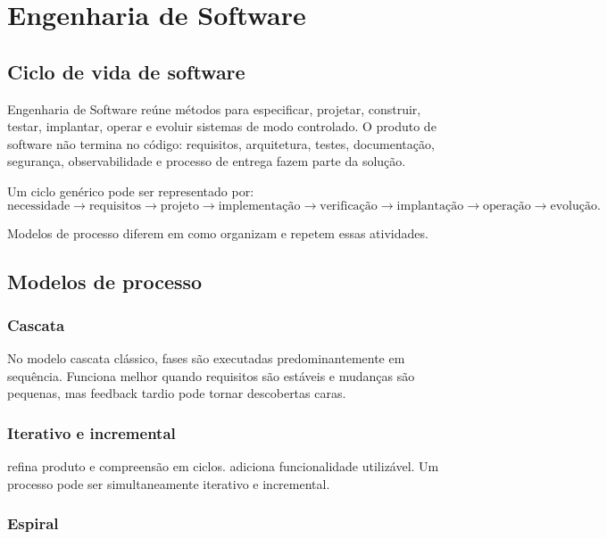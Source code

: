 \chapter{Engenharia de Software}

\section{Ciclo de vida de software}

Engenharia de Software reúne métodos para especificar, projetar, construir, testar, implantar, operar e evoluir sistemas de modo controlado. O produto de software não termina no código: requisitos, arquitetura, testes, documentação, segurança, observabilidade e processo de entrega fazem parte da solução.

Um ciclo genérico pode ser representado por:
\[
\text{necessidade}\rightarrow
\text{requisitos}\rightarrow
\text{projeto}\rightarrow
\text{implementação}\rightarrow
\text{verificação}\rightarrow
\text{implantação}\rightarrow
\text{operação}\rightarrow
\text{evolução}.
\]

Modelos de processo diferem em como organizam e repetem essas atividades.

\section{Modelos de processo}

\subsection{Cascata}

No modelo cascata clássico, fases são executadas predominantemente em sequência. Funciona melhor quando requisitos são estáveis e mudanças são pequenas, mas feedback tardio pode tornar descobertas caras.

\subsection{Iterativo e incremental}

 refina produto e compreensão em ciclos.  adiciona funcionalidade utilizável. Um processo pode ser simultaneamente iterativo e incremental.

\subsection{Espiral}

